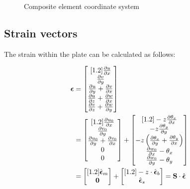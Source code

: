 \begin{figure}[h]
  \centering
  
  \caption{Composite element coordinate system}
\end{figure}



\subsection{Strain vectors}
\label{strain-vectors}

The strain within the plate can be calculated as follows:

\begin{align}
    \label{eq:strain}
  \boldsymbol{\epsilon} &= 
  \begin{bmatrix}[1.2]
  \frac{\partial u}{\partial x} \\
  \frac{\partial v}{\partial y} \\
  \frac{\partial u}{\partial y} + \frac{\partial v}{\partial x} \\
  \frac{\partial u}{\partial z} + \frac{\partial w}{\partial x} \\
  \frac{\partial v}{\partial z} + \frac{\partial w}{\partial y}
  \end{bmatrix}
  \notag \\&=
  \begin{bmatrix}[1.2]
  \frac{\partial u_{0}}{\partial x} \\
  \frac{\partial v_{0}}{\partial y} \\
  \frac{\partial u_{0}}{\partial y} + \frac{\partial v_{0}}{\partial x} \\
  0 \\
  0
  \end{bmatrix}
  +
  \begin{bmatrix}[1.2]
  - z\frac{\partial\theta_{x}}{\partial x} \\
  - z\frac{\partial\theta_{y}}{\partial y} \\
  - z\left( \frac{\partial\theta_{x}}{\partial y} + \frac{\partial\theta_{y}}{\partial x} \right) \\
  \frac{\partial w_{0}}{\partial x} - \theta_{x} \\
  \frac{\partial w_{0}}{\partial y} - \theta_{y}
  \end{bmatrix}
  \notag \\&= 
  \begin{bmatrix}[1.2]
  \hat{\boldsymbol{\epsilon}}_{m} \\
  \mathbf{0}
  \end{bmatrix}
  +
  \begin{bmatrix}[1.2]
  - z \cdot \hat{\boldsymbol{\epsilon}}_{b} \\
  \hat{\boldsymbol{\epsilon}}_{s}
  \end{bmatrix}
  =
  \mathbf{S} \cdot \hat{\boldsymbol{\epsilon}}
\end{align}
  

